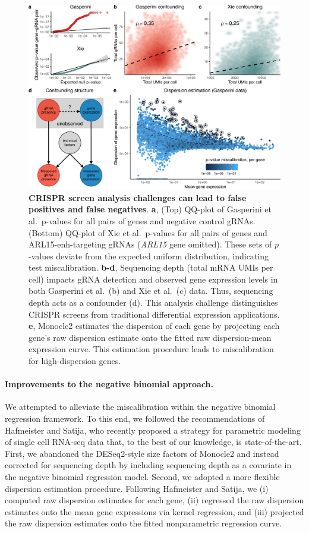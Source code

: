 \documentclass{nature}
\begin{document}
\begin{figure}[h!]
\includegraphics[width = \textwidth]{figures/Figure1/Figure1_cropped.pdf}
\caption{\textbf{CRISPR screen analysis challenges can lead to false positives and false negatives}. \textbf{a}, (Top) QQ-plot of Gasperini et al.\ p-values for all pairs of genes and negative control gRNAs. (Bottom) QQ-plot of Xie et al.\ p-values for all pairs of genes and ARL15-enh-targeting gRNAs (\textit{ARL15} gene omitted). These sets of $p$-values deviate from the expected uniform distribution, indicating test miscalibration. \textbf{b-d}, Sequencing depth (total mRNA UMIs per cell) impacts gRNA detection and observed gene expression levels in both Gasperini et al.\ (b) and Xie et al.\ (c) data. Thus, sequencing depth acts as a confounder (d). This analysis challenge distinguishes CRISPR screens from traditional differential expression applications. \textbf{e}, Monocle2 estimates the dispersion of each gene by projecting each gene's raw dispersion estimate onto the fitted raw dispersion-mean expression curve. This estimation procedure leads to miscalibration for high-dispersion genes.
}
 \label{fig:analysis-challenges}
\end{figure}
\clearpage

\paragraph{Improvements to the negative binomial approach.} 

We attempted to alleviate the miscalibration within the negative binomial regression framework. To this end, we followed the recommendations of Hafmeister and Satija, who recently proposed a strategy for parametric modeling of single cell RNA-seq data that, to the best of our knowledge, is state-of-the-art.\cite{Hafemeister2019}  First, we abandoned the DESeq2-style size factors of Monocle2 and instead corrected for sequencing depth by including sequencing depth as a covariate in the negative binomial regression model. Second, we adopted a more flexible dispersion estimation procedure. Following Hafmeister and Satija, we (i) computed raw dispersion estimates for each gene, (ii) regressed the raw dispersion estimates onto the mean gene expressions via kernel regression, and (iii) projected the raw dispersion estimates onto the fitted nonparametric regression curve.
\end{document}
